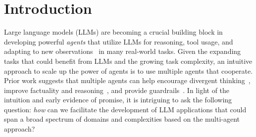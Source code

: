 \section{Introduction}





Large language models (LLMs) are becoming a crucial building block in developing powerful {\em agents} that utilize LLMs for reasoning, tool usage, and adapting to new observations~\cite{yao2022react,xi2023rise,wang2023survey} in many real-world tasks.
Given the expanding tasks that could benefit from LLMs and the growing task complexity, 
an intuitive approach to scale up the power of agents is to use multiple agents that cooperate.
Prior work suggests that multiple agents can help encourage divergent thinking~\cite{liang-arxiv2023}, improve factuality and reasoning~\cite{du2023improving}, and provide guardrails~\cite{wu2023empirical}.
In light of the intuition and early evidence of promise, it is intriguing to ask the following question: %
{\em how} can we facilitate the development of LLM applications that could span a broad spectrum of domains and complexities based on the multi-agent approach?

